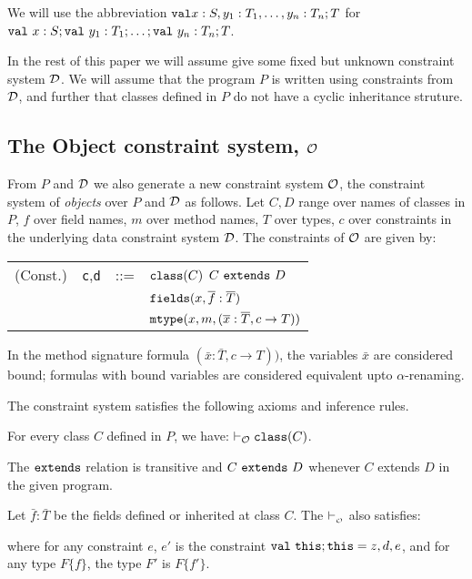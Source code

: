 \documentclass[preprint,nocopyrightspace,9pt]{sigplanconf}
\def\val{\mbox{\tt val}}
\def\klass{\mbox{\tt class}}
\def\this{\mbox{\tt this}}
\def\extends{\mbox{\tt extends}}
\def\fields{\mbox{\tt fields}}
\def\mtype{\mbox{\tt mtype}}
\newcommand\alt{\bnf}
\begin{document}
We will use the abbreviation  $\val x:S,y_1:T_1,\ldots,y_n:T_n;T$
for $\val\ x:S; \val\ y_1:T_1;\ldots;\val\ y_n:T_n;T$.

In the rest of this paper we will assume give some fixed but unknown
constraint system $\cal D$. We will assume that the program $P$ is
written using constraints from $\cal D$, and further that classes
defined in $P$ do not have a cyclic inheritance struture. 

\subsection{The Object constraint system, $\cal O$}\label{sec:O}

From $P$ and $\cal D$ we also generate a new constraint system $\cal
O$, the constraint system of {\em objects} over $P$ and $\cal D$ as
follows. Let $C,D$ range over names of classes in $P$, $f$ over
field names, $m$ over method names, $T$ over types, $c$ over
constraints in the underlying data constraint system $\cal D$.
The constraints of $\cal O$ are given by:

\begin{tabular}{r@{\quad}rcl}
(Const.) & {\tt c},{\tt d} &{::=}& $\klass(C)$ \alt $C\ \extends\ D$ \\
&&& \alt $\fields(x, \bar{f}:\bar{T})$ \\
&&& \alt $\mtype(x,m, (\bar{x}:\bar{T},c \rightarrow T))$\\
\end{tabular}

In the method signature formula $(\bar{x}:\bar{T},c \rightarrow T))$,
the variables $\bar{x}$ are considered bound; formulas with bound variables are considered
equivalent upto $\alpha$-renaming.

The constraint system satisfies the following axioms and inference
rules. 

For every class $C$ defined in $P$, we have: $\vdash_{\cal O} \klass(C)$.

The $\extends$ relation is transitive and $C\ \extends\ D$ whenever
$C$ extends $D$ in the given program.

Let $\bar{f}:\bar{T}$ be the fields defined or inherited at class $C$.
The $\vdash_{\cal_O}$ also satisfies:

\infax[fields]{\Gamma, z:D\{d\} \vdash_{\cal O} \fields(z, \bar{f}:\bar{T'})}

\noindent where for any constraint $e$, $e'$ is the constraint $\val\ \this;\this=z,d,e$,
and for any type $F\{f\}$, the type $F'$ is $F\{f'\}$.
\end{document}
